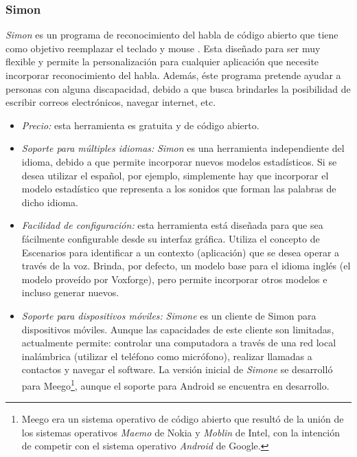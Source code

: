 \subsubsection{Simon}
\label{sec:simon}

\emph{Simon} es un programa de reconocimiento del habla de c\'odigo abierto que tiene como objetivo
reemplazar el teclado y mouse \cite{SimonListen}. Esta dise\~nado para ser muy flexible y permite la
personalizaci\'on para cualquier aplicaci\'on que necesite incorporar reconocimiento
del habla. Adem\'as, \'este programa pretende ayudar a personas con alguna discapacidad, debido
a que busca brindarles la posibilidad de escribir correos electr\'onicos, navegar internet, etc.

\begin{itemize}
    \item \emph{Precio:} esta herramienta es gratuita y de c\'odigo abierto.
    \item \emph{Soporte para m\'ultiples idiomas:} \emph{Simon} es una herramienta independiente del idioma,
    debido a que permite incorporar nuevos modelos estad\'isticos. Si se desea
	utilizar el espa\~nol, por ejemplo, simplemente hay que incorporar el modelo estad\'istico que representa
    a los sonidos que forman las palabras de dicho idioma.
    \item \emph{Facilidad de configuraci\'on:} esta herramienta est\'a dise\~nada para que sea
	f\'acilmente configurable desde su interfaz gr\'afica. Utiliza el concepto de Escenarios para identificar a un contexto (aplicaci\'on)
	que se desea operar a trav\'es de la voz. Brinda, por defecto, un modelo base para el idioma ingl\'es (el
    modelo prove\'ido por Voxforge\cite{Voxforge}), pero permite incorporar otros modelos e incluso generar nuevos.
    \item \emph{Soporte para dispositivos m\'oviles:} \emph{Simone} es un cliente de Simon para dispositivos m\'oviles. Aunque las
	capacidades de este cliente son limitadas, actualmente permite: controlar una computadora a trav\'es de una red
	local inal\'ambrica (utilizar el tel\'efono como micr\'ofono), realizar llamadas a contactos y navegar el software. 
    La versi\'on inicial de \emph{Simone} se desarroll\'o para 
	Meego\footnote{Meego era un sistema operativo de c\'odigo abierto que result\'o de la uni\'on de
	los sistemas operativos \emph{Maemo} de Nokia y \emph{Moblin} de Intel, con la intenci\'on de competir
	con el sistema operativo \emph{Android} de Google.}, aunque el soporte para Android se encuentra en desarrollo.

\end{itemize}
